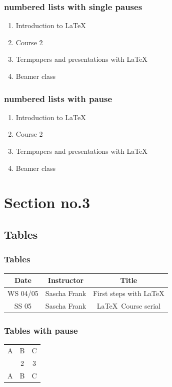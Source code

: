 \documentclass[hyperref={pdfpagelabels=false}]{beamer}
\begin{document}
\begin{frame}
\frametitle{numbered lists with single pauses}
\begin{enumerate}
\item Introduction to  \LaTeX{}  \pause 
\item Course 2 \pause 
\item Termpapers and presentations with \LaTeX{}  \pause 
\item Beamer class
\end{enumerate}
\end{frame}

\begin{frame}
\frametitle{numbered lists with pause}
\begin{enumerate}[<+->]
\item Introduction to  \LaTeX{}  
\item Course 2
\item Termpapers and presentations with \LaTeX{}  
\item Beamer class
\end{enumerate}
\end{frame}




\section{Section no.3} 
\subsection{Tables}
\begin{frame}
\frametitle{Tables}
\begin{tabular}{|c|c|c|}
\hline
\textbf{Date} & \textbf{Instructor} & \textbf{Title} \\
\hline
WS 04/05 & Sascha Frank & First steps with  \LaTeX  \\
\hline
SS 05 & Sascha Frank & \LaTeX \ Course serial \\
\hline
\end{tabular}
\end{frame}


\begin{frame}
\frametitle{Tables with pause}
\begin{tabular}{c c c}
A & B & C \\ 
\pause 
1 & 2 & 3 \\  
\pause 
A & B & C \\ 
\end{tabular} 
\end{frame}
\end{document}
